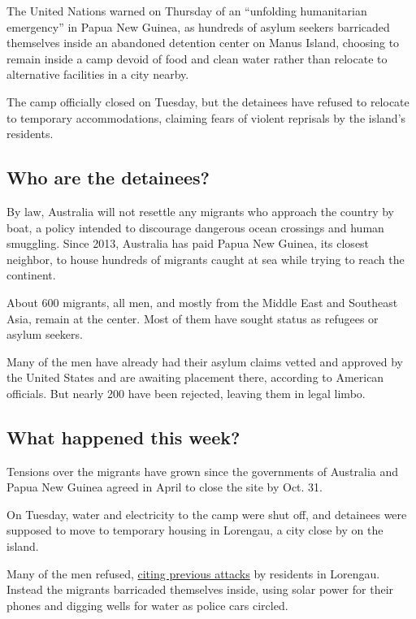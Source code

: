 The United Nations warned on Thursday of an ``unfolding humanitarian
emergency'' in Papua New Guinea, as hundreds of asylum seekers
barricaded themselves inside an abandoned detention center on Manus
Island, choosing to remain inside a camp devoid of food and clean water
rather than relocate to alternative facilities in a city nearby.

The camp officially closed on Tuesday, but the detainees have refused to
relocate to temporary accommodations, claiming fears of violent
reprisals by the island's residents.

\hypertarget{who-are-the-detainees}{%
\subsection{Who are the detainees?}\label{who-are-the-detainees}}

By law, Australia will not resettle any migrants who approach the
country by boat, a policy intended to discourage dangerous ocean
crossings and human smuggling. Since 2013, Australia has paid Papua New
Guinea, its closest neighbor, to house hundreds of migrants caught at
sea while trying to reach the continent.

About 600 migrants, all men, and mostly from the Middle East and
Southeast Asia, remain at the center. Most of them have sought status as
refugees or asylum seekers.

Many of the men have already had their asylum claims vetted and approved
by the United States and are awaiting placement there, according to
American officials. But nearly 200 have been rejected, leaving them in
legal limbo.

\hypertarget{what-happened-this-week}{%
\subsection{What happened this week?}\label{what-happened-this-week}}

Tensions over the migrants have grown since the governments of Australia
and Papua New Guinea agreed in April to close the site by Oct. 31.

On Tuesday, water and electricity to the camp were shut off, and
detainees were supposed to move to temporary housing in Lorengau, a city
close by on the island.

Many of the men refused,
\href{https://www.nytimes3xbfgragh.onion/2017/10/25/world/australia/australia-manus-refugees.html}{citing
previous attacks} by residents in Lorengau. Instead the migrants
barricaded themselves inside, using solar power for their phones and
digging wells for water as police cars circled.

